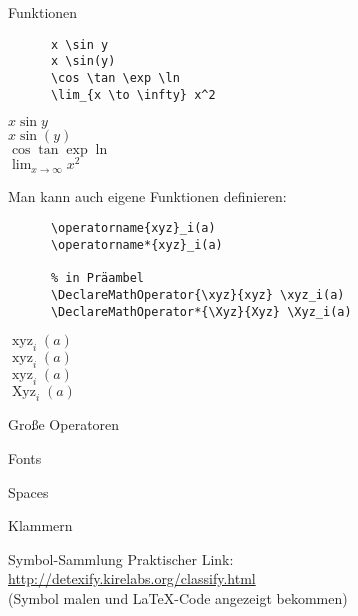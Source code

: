 \begin{frame}[fragile]{Funktionen}
  \begin{CodeExample}{0.70}
    \begin{lstlisting}
      x \sin y
      x \sin(y)
      \cos \tan \exp \ln
      \lim_{x \to \infty} x^2
    \end{lstlisting}
  \CodeResult
    $x \sin y$ \\
    $x \sin(y)$ \\
    $\cos \tan \exp \ln$ \\
    $\displaystyle \lim_{x \to \infty} x^2$
  \end{CodeExample}
  \vspace{5pt}
  Man kann auch eigene Funktionen definieren:
  \vspace{-1em}
  \begin{CodeExample}{0.70}
    \begin{lstlisting}
      \operatorname{xyz}_i(a)
      \operatorname*{xyz}_i(a)

      % in Präambel
      \DeclareMathOperator{\xyz}{xyz} \xyz_i(a)
      \DeclareMathOperator*{\Xyz}{Xyz} \Xyz_i(a)
    \end{lstlisting}
  \CodeResult
    $\operatorname{xyz}_i(a)$ \\
    $\displaystyle \operatorname*{xyz}_i(a)$ \\[\baselineskip]
    $\operatorname{xyz}_i(a)$ \\
    $\displaystyle \operatorname*{Xyz}_i(a)$
  \end{CodeExample}
\end{frame}

\begin{frame}[fragile]{Große Operatoren}
\end{frame}

\begin{frame}[fragile]{Fonts}
\end{frame}

\begin{frame}[fragile]{Spaces}
\end{frame}

\begin{frame}[fragile]{Klammern}
\end{frame}

\begin{frame}[fragile]{
  Symbol-Sammlung
  \hfill{}
  \hfill{}
}
  Praktischer Link: \\
  \url{http://detexify.kirelabs.org/classify.html} \\
  (Symbol malen und \LaTeX-Code angezeigt bekommen)
\end{frame}

